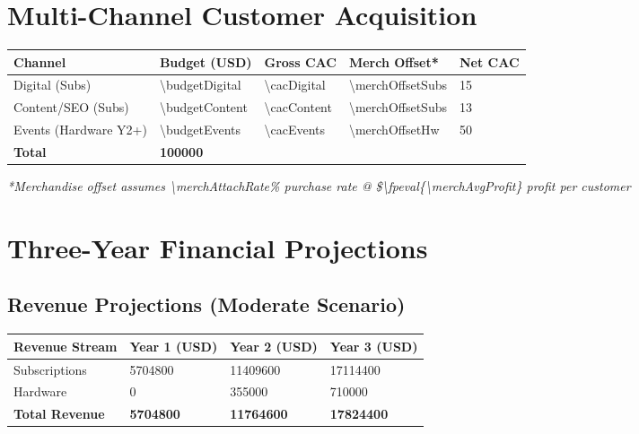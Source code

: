 \documentclass[11pt]{article}
\newcommand{\numfpeval}[1]{\num{\fpeval{#1}}}
\begin{document}
\section{Multi-Channel Customer Acquisition}

\begin{table}[H]
\centering
\begin{tabularx}{\linewidth}{l Y Y Y Y}
\toprule
Channel & Budget (USD) & Gross CAC\cite{authoranalysis2024} & Merch Offset* & Net CAC \\\midrule
Digital (Subs) & \num{\budgetDigital} & \num{\cacDigital} & \num{\merchOffsetSubs} & \num{15} \\
Content/SEO (Subs) & \num{\budgetContent} & \num{\cacContent} & \num{\merchOffsetSubs} & \num{13} \\
Events (Hardware Y2+) & \num{\budgetEvents} & \num{\cacEvents} & \num{\merchOffsetHw} & \num{50} \\\midrule
\textbf{Total} & \textbf{\num{100000}} &  &  &  \\
\bottomrule
\end{tabularx}
\end{table}
\textit{*Merchandise offset assumes \num{\merchAttachRate}\% purchase rate @ \$\numfpeval{\merchAvgProfit} profit per customer}

\section{Three-Year Financial Projections}

\subsection{Revenue Projections (Moderate Scenario)}
\begin{table}[H]
\centering
\begin{tabularx}{\linewidth}{l Y Y Y}
\toprule
Revenue Stream & Year 1 (USD) & Year 2 (USD) & Year 3 (USD) \\\midrule
Subscriptions & \num{5704800} & \num{11409600} & \num{17114400} \\
Hardware & \num{0} & \num{355000} & \num{710000} \\\midrule
\textbf{Total Revenue} & \textbf{\num{5704800}} & \textbf{\num{11764600}} & \textbf{\num{17824400}} \\
\bottomrule
\end{tabularx}
\end{table}
\end{document}
